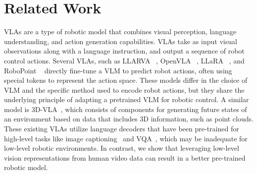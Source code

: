 \section{Related Work}
\label{sec:rw}



 VLAs are a type of robotic model that combines visual perception, language understanding, and action generation capabilities. VLAs take as input visual observations along with a language instruction, and output a sequence of robot control actions. Several VLAs, such as LLARVA ~\cite{niuLLARVAVisionActionInstruction2024}, OpenVLA ~\cite{kimOpenVLAOpenSourceVisionLanguageAction2024}, LLaRA ~\cite{liLLaRASuperchargingRobot2024}, and RoboPoint ~\cite{yuanRoboPointVisionLanguageModel2024} directly fine-tune a VLM to predict robot actions, often using special tokens to represent the action space. These models differ in the choice of VLM and the specific method used to encode robot actions, but they share the underlying principle of adapting a pretrained VLM for robotic control. A similar model is 3D-VLA~\cite{zhen3DVLA3DVisionLanguageAction2024}, which consists of components for generating future states of an environment based on data that includes 3D information, such as point clouds. These existing VLAs utilize language decoders that have been pre-trained for high-level tasks like image captioning~\cite{kimOpenVLAOpenSourceVisionLanguageAction2024} and VQA~\cite{brohanRT2VisionLanguageActionModels2023}, which may be inadequate for low-level robotic environments. In contrast, we show that leveraging low-level vision representations from human video data can result in a better pre-trained robotic model.





